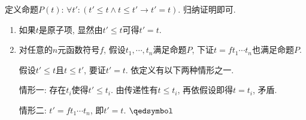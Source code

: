 \documentclass[UTF8]{ctexart}
\begin{document}

定义命题$P(t)$: $\forall t':
(t'\leqslant t\land t\leqslant t'\to t'=t)$. 归纳证明即可.

\begin{enumerate}
    \item 如果$t$是原子项, 显然由$t'\leqslant t$可得$t'=t$.
    \item 对任意的$n$元函数符号$f$, 假设$t_1,\cdots,t_n$满足命题$P$,
    下证$t=ft_1\cdots t_n$也满足命题$P$.

    \hspace{2.17em}
    假设$t'\leqslant t$且$t\leqslant t'$, 要证$t'=t$. 依定义有以下两种情形之一.

    \hspace{2.17em}
    情形一: 存在$t_i$使得$t'\leqslant t_i$. 由传递性有$t\leqslant t_i$,
    再依假设即得$t=t_i$, 矛盾.

    \hspace{2.17em}
    情形二: $t'=ft_1\cdots t_n$, 即$t'=t$. \hfill $\qedsymbol$
\end{enumerate}
\end{document}
